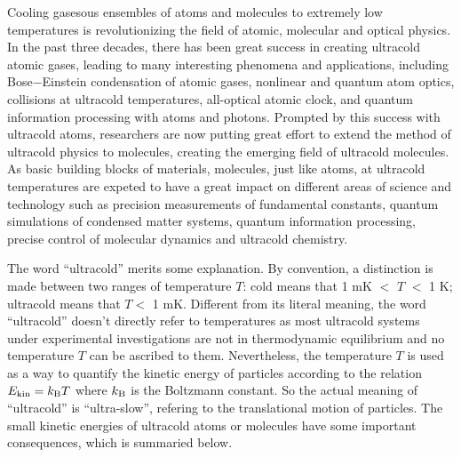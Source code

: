 Cooling gasesous ensembles of atoms and molecules to extremely low temperatures is  revolutionizing the 
field of atomic, molecular and optical physics. 
In the past three decades, there has been great success in creating ultracold atomic gases\cite{southwell2002, chu2002}, 
leading to many interesting phenomena and applications,  
including Bose$-$Einstein condensation of atomic gases\cite{anglin2002}, nonlinear and quantum atom 
optics\cite{rolston2002}, collisions at ultracold temperatures\cite{burnett2002}, all-optical atomic
clock\cite{udem2002},
and quantum information processing with atoms and photons\cite{monroe2002}. 
Prompted by this success with 
ultracold atoms, researchers are now putting great effort to extend the method of ultracold physics to molecules,
creating the emerging field of ultracold molecules. 
As basic building blocks of materials, molecules,  just like atoms,  at ultracold temperatures are expeted to have  a great
impact on different areas of science and technology such as precision measurements of fundamental constants,  quantum simulations of condensed matter systems, quantum information processing, precise control of molecular
dynamics and ultracold chemistry\cite{our-njp-review, friedrich2009, schnell2009, Bell2009, krems2010cold, Ni2009,
Jin2011, Jin2012, quemener2012, Baranov2012}. 


The word ``ultracold'' merits some explanation. By convention, a distinction is made between two ranges of 
temperature $T$: cold means that 1 mK $<$ $T$ $<$ 1 K; ultracold means that $T < $ 1 mK.   Different from its literal 
meaning, the word  ``ultracold'' doesn't directly 
refer to temperatures  as most ultracold systems under experimental investigations are not in thermodynamic 
equilibrium and no temperature $T$ can be ascribed to them.  Nevertheless, the temperature $T$ is used as a way to 
quantify the kinetic energy of particles according to the relation $E_{\rm kin} = k_{\rm B} T$ where $k_{\rm B}$ is the 
Boltzmann constant.   So the actual meaning of ``ultracold'' is ``ultra-slow'', refering to the translational motion of 
particles.  
The small kinetic energies of  ultracold atoms or molecules have some important consequences, which is summaried below.

